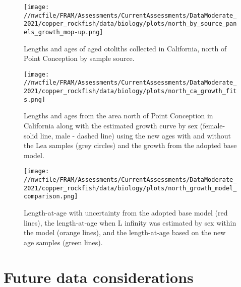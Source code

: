 \documentclass[11pt,
  english,
  a4paper,
]{article}
\begin{document}
\begin{figure}
\centering
\texttt{[image: //nwcfile/FRAM/Assessments/CurrentAssessments/DataModerate\_2021/copper\_rockfish/data/biology/plots/north\_by\_source\_panels\_growth\_mop-up.png]}
\caption{Lengths and ages of aged otoliths collected in California, north of Point Conception by sample source.\label{fig:new-north-samples}}
\end{figure}

\tagmcend\tagstructend


\begin{figure}
\centering
\texttt{[image: //nwcfile/FRAM/Assessments/CurrentAssessments/DataModerate\_2021/copper\_rockfish/data/biology/plots/north\_ca\_growth\_fits.png]}
\caption{Lengths and ages from the area north of Point Conception in California along with the estimated growth curve by sex (female- solid line, male - dashed line) using the new ages with and without the Lea samples (grey circles) and the growth from the adopted base model.\label{fig:north-growth-fit}}
\end{figure}

\tagmcend\tagstructend


\begin{figure}
\centering
\texttt{[image: //nwcfile/FRAM/Assessments/CurrentAssessments/DataModerate\_2021/copper\_rockfish/data/biology/plots/north\_growth\_model\_comparison.png]}
\caption{Length-at-age with uncertainty from the adopted base model (red lines), the length-at-age when L infinity was estimated by sex within the model (orange lines), and the length-at-age based on the new age samples (green lines).\label{fig:north-growth-model}}
\end{figure}

\tagmcend\tagstructend

\clearpage


\hypertarget{future-data-considerations}{%
\section{Future data considerations}\label{future-data-considerations}}
\end{document}

